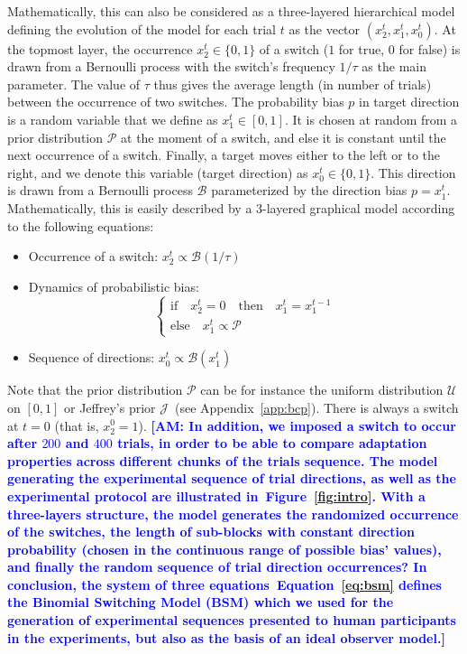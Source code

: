 \documentclass[12pt,english]{article}%
\newcommand{\choice}[1]{ %
	\left\{ %
		\begin{array}{l} #1 \end{array} %
	\right. }
\newcommand{\eql}[1]{\begin{equation}#1\end{equation}}
\newcommand{\Bb}{\mathcal{B}}
\newcommand{\Jj}{\mathcal{J}}
\newcommand{\Pp}{\mathcal{P}}
\newcommand{\Uu}{\mathcal{U}}
\newcommand{\seeFig}[1]{Figure~\ref{fig:#1}}
\newcommand{\seeEq}[1]{Equation~\ref{eq:#1}}
\newcommand{\seeApp}[1]{Appendix~\ref{app:#1}}
\newcommand{\AM}[1]{\textbf{\textcolor{blue}{[AM: #1]}}}
\begin{document}
Mathematically, this can also be considered as a three-layered hierarchical model
defining the evolution of the model for each trial $t$ as the vector  $(x_2^t, x_1^t, x_0^t)$.
At the topmost layer,
the occurrence $x_2^t \in \{ 0, 1 \}$ of a switch ($1$ for true, $0$ for false)
is  drawn from a Bernoulli process with the switch's frequency $1/\tau$ as the main parameter.
The value of $\tau$ thus gives the average length (in number of trials)
between the occurrence of two switches.
The probability bias $p$ in target direction is a random variable that we define as $x_1^t \in [0, 1]$.
It is chosen at random from a prior distribution $\Pp$ at the moment of a switch,
and else it is constant until the next occurrence of a switch.
Finally, a target moves either to the left or to the right,
and we denote this variable (target direction) as $x_0^t \in \{ 0, 1 \}$.
This direction is drawn from a Bernoulli process $\Bb$
parameterized by the direction bias $p=x_1^t$.
Mathematically, this is easily described
by a 3-layered graphical model according to %
the following equations:
\begin{itemize}
    \item Occurrence of a switch: $x_2^t \propto \Bb(1/\tau)$
    \item Dynamics of probabilistic bias: \eql{\choice{\text{if} \quad x_2^t=0 \quad \text{then} \quad  x_1^t = x_1^{t-1} \\
\text{else} \quad x_1^t \propto \Pp  }\label{eq:bsm}}
    \item Sequence of directions:  $x_0^t \propto \Bb(x_1^t)$
\end{itemize}
Note that the prior distribution $\Pp$ can be for instance
the uniform distribution $\Uu$ on $ [ 0, 1 ] $ or
Jeffrey's prior $\Jj$~(see \seeApp{bcp}).
There is always a switch at $t=0$ (that is, $x_2^0=1$). \AM{In addition, we imposed a switch to occur after $200$ and $400$ trials, in order to be able to compare adaptation properties across different chunks of the trials sequence.
The model generating the experimental sequence of trial directions, as well as the experimental protocol are illustrated in~\seeFig{intro}. With a three-layers structure, the model generates the randomized occurrence of the switches,
the length of sub-blocks with constant direction probability
(chosen in the continuous range of possible bias' values), and finally the random sequence of trial direction occurrences?
In conclusion, the system of three equations~\seeEq{bsm}
defines the Binomial Switching Model (BSM)
which we used for the generation of experimental sequences presented to human participants in the experiments,
but also as the basis of an ideal observer model.}
\end{document}
